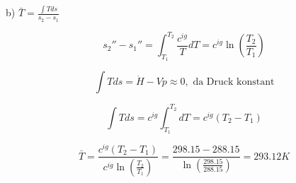 b) $\bar{T} = \frac{\int T ds}{s_{2} - s_{1}}$

\[
s_{2}'' - s_{1}'' = \int_{T_{1}}^{T_{2}} \frac{c^{ig}}{T} dT = c^{ig} \ln \left( \frac{T_{2}}{T_{1}} \right)
\]

\[
\int T ds = \dot{H} - V \dot{p} \approx 0, \text{ da Druck konstant}
\]

\[
\int T ds = c^{ig} \int_{T_{1}}^{T_{2}} dT = c^{ig} (T_{2} - T_{1})
\]

\[
\bar{T} = \frac{c^{ig} (T_{2} - T_{1})}{c^{ig} \ln \left( \frac{T_{2}}{T_{1}} \right)} = \frac{298.15 - 288.15}{\ln \left( \frac{298.15}{288.15} \right)} = 293.12 K
\]